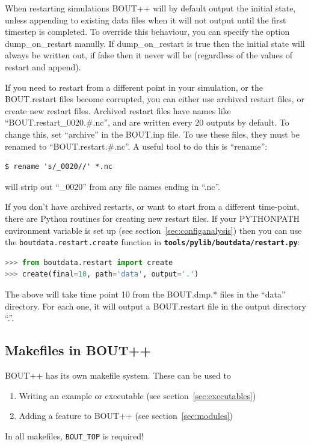 \documentclass[12pt]{article}
\newcommand{\file}[1]{\texttt{\bf #1}}
\begin{document}
When restarting simulations BOUT++ will by default output the initial state,
unless appending to existing data files when it will not output until the first
timestep is completed. To override this behaviour, you can specify the option
dump\_on\_restart manully. If dump\_on\_restart is true then the initial state
will always be written out, if false then it never will be (regardless of the
values of restart and append).

If you need to restart from a different point in your simulation, or the
BOUT.restart files become corrupted, you can either use archived restart files,
or create new restart files.  Archived restart files have names like
``BOUT.restart\_0020.\#.nc'', and are written every 20 outputs by default. To
change this, set ``archive'' in the BOUT.inp file.  To use these files, they
must be renamed to ``BOUT.restart.\#.nc''. A useful tool to do this is
``rename'':
%
\begin{verbatim}
$ rename 's/_0020//' *.nc
\end{verbatim}
%
will strip out ``\_0020'' from any file names ending in ``.nc''.

If you don't have archived restarts, or want to start from a different
time-point, there are Python routines for creating new restart files. If your
PYTHONPATH environment variable is set up (see
section~\ref{sec:configanalysis}) then you can use the
%
\lstinline!boutdata.restart.create!
%
 function in \file{tools/pylib/boutdata/restart.py}:

%
\begin{lstlisting}[language=python,numbers=none]
>>> from boutdata.restart import create
>>> create(final=10, path='data', output='.')
\end{lstlisting}
%
The above will take time point 10 from the BOUT.dmp.* files in the ``data''
directory.  For each one, it will output a BOUT.restart file in the output
directory ``.''.



\subsection{Makefiles in BOUT++}
%
BOUT++ has its own makefile system. These can be used to
%
\begin{enumerate}
 \item Writing an example or executable (see section~\ref{sec:executables})
 \item Adding a feature to BOUT++ (see section~\ref{sec:modules})
\end{enumerate}
%
In all makefiles, \texttt{BOUT\_TOP} is required!
\end{document}
